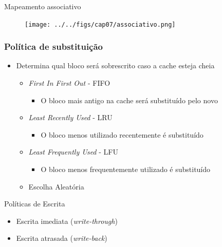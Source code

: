 \documentclass[aspectratio=169,
				xcolor=table]{beamer}
\begin{document}
	\begin{frame}{Mapeamento associativo}
		\begin{figure}[hbtp]
			\centering
			\texttt{[image: ../../figs/cap07/associativo.png]}
		\end{figure}		
	\end{frame}	
	

	\begin{frame}
		\frametitle{Política de substituição}
		\begin{itemize}
			\item Determina qual bloco será sobrescrito caso a cache esteja cheia
			\begin{itemize}
				\item \textit{First In First Out} - FIFO
				\begin{itemize}
					\item O bloco mais antigo na cache será substituído pelo novo
				\end{itemize}
				\item \textit{Least Recently Used} - LRU
				\begin{itemize}
					\item O bloco menos utilizado recentemente é substituído
				\end{itemize}
				\item \textit{Least Frequently Used} - LFU
				\begin{itemize}
					\item O bloco menos frequentemente utilizado é substituído
				\end{itemize}				
				\item Escolha Aleatória
				
			\end{itemize}
		\end{itemize}
	\end{frame}

	\begin{frame}{Políticas de Escrita}
		\begin{itemize}
			\item Escrita imediata (\textit{write-through})
			\item Escrita atrasada (\textit{write-back})
		\end{itemize}
	\end{frame}
\end{document}
